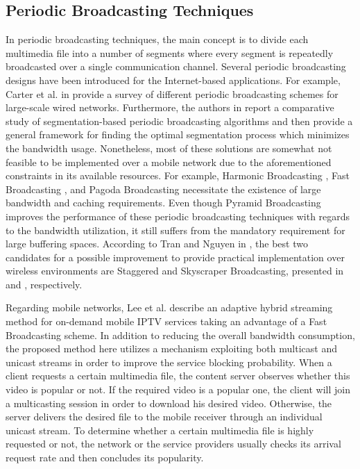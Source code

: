\subsection{Periodic Broadcasting Techniques}
In periodic broadcasting techniques, the main concept is to divide each multimedia file into a number of segments where every segment is repeatedly broadcasted over a single communication channel. Several periodic broadcasting designs have been introduced for the Internet-based applications. For example, Carter et al. in \cite{ref6} provide a survey of different periodic broadcasting schemes for large-scale wired networks. Furthermore, the authors in \cite{ref7} report a comparative study of segmentation-based periodic broadcasting algorithms and then provide a general framework for finding the optimal segmentation process which minimizes the bandwidth usage. Nonetheless, most of these solutions are somewhat not feasible to be implemented over a mobile network due to the aforementioned constraints in its available resources. For example, Harmonic Broadcasting \cite{ref8}, Fast Broadcasting \cite{ref9}, and Pagoda Broadcasting \cite{ref10} necessitate the existence of large bandwidth and caching requirements. Even though Pyramid Broadcasting \cite{ref11} improves the performance of these periodic broadcasting techniques with regards to the bandwidth utilization, it still suffers from the mandatory requirement for large buffering spaces. According to Tran and Nguyen in \cite{ref12}, the best two candidates for a possible improvement to provide practical implementation over wireless environments are Staggered and Skyscraper Broadcasting, presented in \cite{ref13} and \cite{ref14}, respectively. 

Regarding mobile networks, Lee et al. \cite{ref15} describe an adaptive hybrid streaming method for on-demand mobile IPTV services taking an advantage of a Fast Broadcasting scheme. In addition to reducing the overall bandwidth consumption, the proposed method here utilizes a mechanism exploiting both multicast and unicast streams in order to improve the service blocking probability. When a client requests a certain multimedia file, the content server observes whether this video is popular or not. If the required video is a popular one, the client will join a multicasting session in order to download his desired video. Otherwise, the server delivers the desired file to the mobile receiver through an individual unicast stream. To determine whether a certain multimedia file is highly requested or not, the network or the service providers usually checks its arrival request rate and then concludes its popularity.


